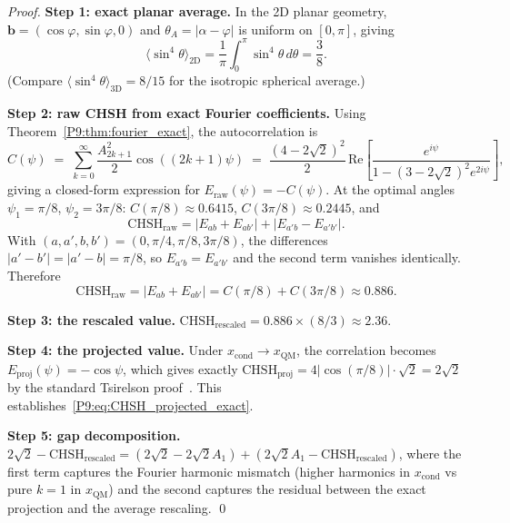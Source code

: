 \documentclass[11pt,a4paper]{article}
\theoremstyle{definition}
\theoremstyle{remark}
\newcommand{\xcond}{x_{\mathrm{cond}}}
\newcommand{\Bvec}{\mathbf{b}}
\newcommand{\CHSH}{\mathrm{CHSH}}
\newcommand{\Tsirelson}{2\sqrt{2}}
\begin{document}
\begin{proof}
\textbf{Step 1: exact planar average.}
In the 2D planar geometry, $\Bvec = (\cos\varphi,\sin\varphi,0)$ and
$\theta_A = |\alpha-\varphi|$ is uniform on $[0,\pi]$, giving
\begin{equation}
  \langle\sin^4\theta\rangle_\mathrm{2D}
  = \frac{1}{\pi}\int_0^{\pi}\sin^4\theta\,d\theta
  = \frac{3}{8}.
  \label{P9:eq:sin4_2D_exact}
\end{equation}
(Compare $\langle\sin^4\theta\rangle_\mathrm{3D}=8/15$ for the isotropic
spherical average.)
 
\textbf{Step 2: raw CHSH from exact Fourier coefficients.}
Using Theorem~\ref{P9:thm:fourier_exact}, the autocorrelation is
\begin{equation}
  C(\psi)
  \;=\; \sum_{k=0}^{\infty}\frac{A_{2k+1}^2}{2}\cos((2k+1)\psi)
  \;=\; \frac{(4-2\sqrt{2})^2}{2}\,
        \mathrm{Re}\!\left[\frac{e^{i\psi}}{1-(3-2\sqrt{2})^2 e^{2i\psi}}\right],
  \label{P9:eq:C_exact}
\end{equation}
giving a closed-form expression for $E_\mathrm{raw}(\psi) = -C(\psi)$.
At the optimal angles $\psi_1=\pi/8$, $\psi_2=3\pi/8$:
$C(\pi/8)\approx0.6415$, $C(3\pi/8)\approx0.2445$, and
\begin{equation}
  \CHSH_\mathrm{raw}
  = \bigl|E_{ab}+E_{ab'}\bigr| + \bigl|E_{a'b}-E_{a'b'}\bigr|.
\end{equation}
With $(a,a',b,b')=(0,\pi/4,\pi/8,3\pi/8)$, the differences
$|a'-b'|=|a'-b|=\pi/8$, so $E_{a'b}=E_{a'b'}$ and the second term
vanishes identically. Therefore
\begin{equation}
  \CHSH_\mathrm{raw}
  = \bigl|E_{ab}+E_{ab'}\bigr|
  = C(\pi/8)+C(3\pi/8)
  \approx 0.886.
  \label{P9:eq:CHSH_raw_value}
\end{equation}
 
\textbf{Step 3: the rescaled value.}
$\CHSH_\mathrm{rescaled} = 0.886\times(8/3)\approx 2.36$.
 
\textbf{Step 4: the projected value.}
Under $\xcond\to x_\mathrm{QM}$, the correlation becomes
$E_\mathrm{proj}(\psi) = -\cos\psi$, which gives exactly
$\CHSH_\mathrm{proj} = 4|\cos(\pi/8)|\cdot\sqrt{2} = \Tsirelson$
by the standard Tsirelson proof~\cite{Tsirelson1980}.
This establishes~\eqref{P9:eq:CHSH_projected_exact}.
 
\textbf{Step 5: gap decomposition.}
$\Tsirelson - \CHSH_\mathrm{rescaled}
= (\Tsirelson - \Tsirelson A_1) + (\Tsirelson A_1 - \CHSH_\mathrm{rescaled})$,
where the first term captures the Fourier harmonic mismatch
(higher harmonics in $\xcond$ vs pure $k=1$ in $x_\mathrm{QM}$)
and the second captures the residual between the exact projection and
the average rescaling.
\qed
\end{proof}
 
\end{document}
